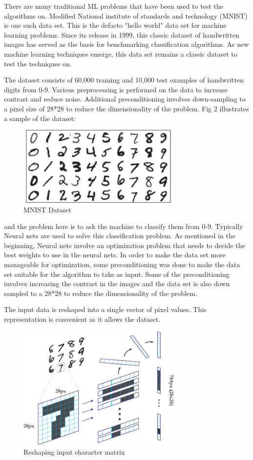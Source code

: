 \documentclass[10pt,twocolumn]{article}
\begin{document}
There are many traditional ML problems that have been used to test the algorithms on. Modified National institute of standards and technology (MNIST) is one such data set. This is the defacto "hello world" data set for machine learning problems. Since its release in 1999, this classic dataset of handwritten images has served as the basis for benchmarking classification algorithms. As new machine learning techniques emerge, this data set remains a classic dataset to test the techniques on. 

The dataset consists of 60,000 training and 10,000 test examples of handwritten digits from 0-9. Various preprocessing is performed on the data to increase contrast and reduce noise. Additional  preconditioning involves down-sampling to a pixel size of 28*28 to reduce the dimensionality of the problem. Fig 2 illustrates a sample of the dataset:

\begin{figure}
\includegraphics[width=3.2in]{./mnist.png}
\caption{MNIST Dataset}
\end{figure}

 and the problem here is to ask the machine to classify them from 0-9. Typically Neural nets are used to solve this classification problem. As mentioned in the beginning, Neural nets involve an optimization problem that needs to decide the best weights to use in the neural nets. In order to make the data set more manageable for optimization, some preconditioning was done to make the data set suitable for the algorithm to take as input. Some of the preconditioning involves increasing the contrast in the images and  the data set is also down sampled to a 28*28 to reduce the dimensionality of the problem.



The input data is reshaped into a single vector of pixel values. This representation is convenient as it allows the dataset.



\begin{figure}
\includegraphics[width=3.2in]{./mnist-reshape.png}
\caption{Reshaping input character matrix}
\end{figure}
\end{document}

